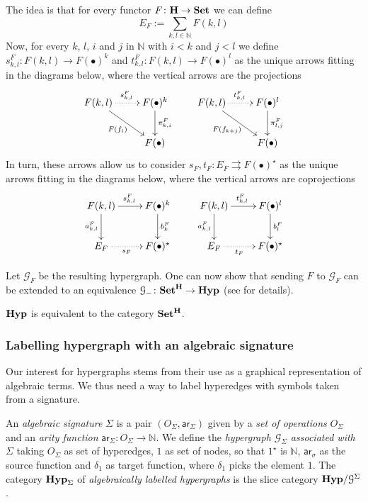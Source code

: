 \documentclass[a4paper,UKenglish,cleveref,pdftex,thm-restate,numberwithinsect]{lipics-v2021}
\newcommand{\Set}{\mathbf{Set}}
\newcommand{\catname}[1]{\textbf{\textup{#1}}}
\newcommand{\hyp}{\catname{Hyp}}
\newcommand{\hyps}{\catname{Hyp}_{\Sigma}}
\newcommand{\ari}{\mathsf{ar}}
\begin{document}
The idea is that for every functor $F\colon \catname{H}\to \catname{Set}$ we can define
\[E_F:=\sum_{k,l\in \mathbb{N}}F(k,l)\]
%
Now, for every $k$, $l$, $i$ and $j$ in $\mathbb{N}$ with $i< k$ and $j< l$ we define $s^F_{k,l}\colon F(k,l)\to F(\bullet)^k$ and  $t^F_{k,l}\colon F(k,l)\to F(\bullet)^l$ as the unique arrows fitting in the diagrams below, where the vertical arrows are the projections
\[\xymatrix{F(k,l)  \ar@{.>}[r]^{s^F_{k,l}} \ar[dr]_{F(f_i)}& F(\bullet)^{k} \ar[d]^{\pi^F_{k,i}} & F(k,l) \ar@{.>}[r]^{t^F_{k,l}} \ar[dr]_{F(f_{k+j})} & F(\bullet)^{l} \ar[d]^{\pi^F_{l,j}} \\ & F(\bullet) && F(\bullet)}\]
%
In turn, these arrows allow us to consider
$s_F, t_F\colon E_F\rightrightarrows F(\bullet)^{\star}$ as the unique arrows fitting in the diagrams below, where the vertical arrows are coprojections
\[\xymatrix{F(k,l) \ar[d]_{a^F_{k,l}}  \ar[r]^{s^{F}_{k,l}}& F(\bullet)^{k} \ar[d]^{b^F_{k}} & F(k,l) \ar[d]_{a^F_{k,l}}  \ar[r]^{t^{F}_{k,l}}& F(\bullet)^{l} \ar[d]^{b^F_{l}}\\ E_F \ar@{.>}[r]_-{s_F}& F(\bullet)^\star & E_F \ar@{.>}[r]_-{t_F}& F(\bullet)^\star}\]

Let $\mathcal{G}_F$ be the resulting hypergraph. One can now show that  sending $F$ to $\mathcal{G}_F$ can be extended to an equivalence $\mathcal{G}_{-}\colon \Set^{\catname{H}}\to \hyp$ (see \cite{castelnovo2023thesis,CastelnovoGM24} for details).


\begin{proposition}
	$\hyp$ is equivalent to the category $\Set^{\catname{H}}$.
\end{proposition}
\fi

\subsubsection{Labelling hypergraph with an algebraic signature}\label{sssect:hyp_alg_sign}

Our interest for hypergraphs stems from their use as a graphical representation of algebraic terms. We thus need a way to label hyperedges with symbols taken from a signature.

\begin{definition}
An \emph{algebraic signature} $\Sigma$ is a pair $(O_\Sigma, \ari_\Sigma)$ given by a \emph{set of operations} $O_\Sigma$ and an \emph{arity function} $\ari_\Sigma\colon O_\Sigma \to \mathbb{N}$. 
%
We define the \emph{hypergraph $\mathcal{G}_\Sigma$ associated with $\Sigma$} taking $O_\Sigma$ as set of hyperedges, $1$ as set of nodes, so that $1^\star$ is $\mathbb{N}$, $\ari_\sigma$ as the source function and $\delta_1$ as target function, where $\delta_1$ picks the element $1$. The category $\hyps$ of \emph{algebraically labelled hypergraphs} is the slice category $\hyp/\mathcal{G}^\Sigma$.
\end{definition}
\end{document}
